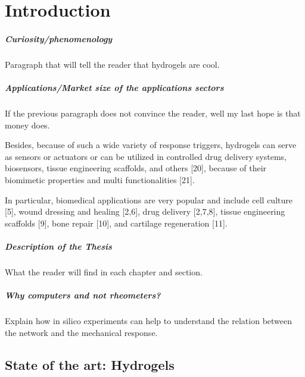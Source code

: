 \chapter{Introduction}\label{ch1:Intro}


\paragraph{Curiosity/phenomenology} Paragraph that will tell the reader that hydrogels are cool.

\paragraph{Applications/Market size of the applications sectors} If the previous paragraph does not convince the reader, well my last hope is that money does.

Besides, because of such a wide variety of response triggers, hydrogels can serve as sensors or actuators or can be utilized in controlled drug delivery systems, biosensors, tissue engineering scaffolds, and others [20], because of their biomimetic properties and multi functionalities [21]\citep{bustamante-torresHydrogelsClassificationAccording2021}.

In particular, biomedical applications are very popular and include cell culture [5], wound dressing and healing [2,6], drug delivery [2,7,8], tissue engineering scaffolds [9], bone repair [10], and cartilage regeneration [11]\citep{picchioniHydrogelsBasedDynamic2018}. 
 

\paragraph{Description of the Thesis} What the reader will find in each chapter and section.

\paragraph{Why computers and not rheometers?} Explain how in silico experiments can help to understand the relation between the network and the mechanical response.

\section{State of the art: Hydrogels}\label{ch1:StateArt}

